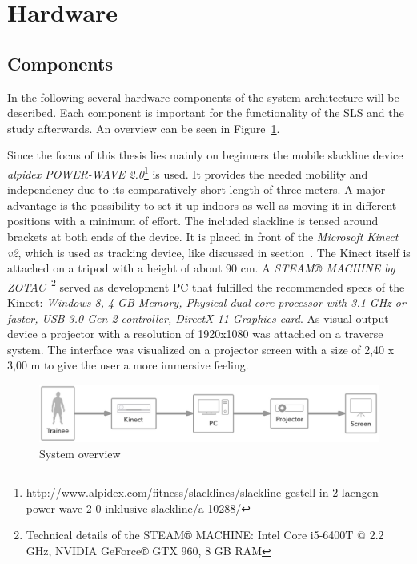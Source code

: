 \section{Hardware}\label{5_1_systemSetup}
\subsection{Components}\label{5_1_hardwareComponents}
In the following several hardware components of the system architecture will be described. Each component is important for the functionality of the SLS and the study afterwards. An overview can be seen in Figure~\ref{fig:5_3_systemArchitecture}.

Since the focus of this thesis lies mainly on beginners the mobile slackline device \textit{alpidex POWER-WAVE 2.0}\footnote{\url{http://www.alpidex.com/fitness/slacklines/slackline-gestell-in-2-laengen-power-wave-2-0-inklusive-slackline/a-10288/}} is used.
It provides the needed mobility and independency due to its comparatively short length of three meters.
A major advantage is the possibility to set it up indoors as well as moving it in different positions with a minimum of effort.
The included slackline is tensed around brackets at both ends of the device.
It is placed in front of the \textit{Microsoft Kinect v2}, which is used as tracking device, like discussed in section~\textit{}. The Kinect itself is attached on a tripod with a height of about 90 cm.
A \textit{STEAM® MACHINE by ZOTAC}~\footnote{Technical details of the STEAM® MACHINE: Intel Core i5-6400T @ 2.2 GHz, NVIDIA GeForce® GTX 960, 8 GB RAM} served as development PC that fulfilled the recommended specs of the Kinect: \textit{Windows 8, 4 GB Memory, Physical dual-core processor with 3.1 GHz or faster, USB 3.0 Gen-2 controller, DirectX 11 Graphics card}. As visual output device a projector with a resolution of 1920x1080 was attached on a traverse system.
The interface was visualized on a projector screen with a size of 2,40 x 3,00 m to give the user a more immersive feeling.

\begin{figure}[htb]
	\centering
	\begin{minipage}[t]{1\linewidth}
		\centering
		\includegraphics[width=1\linewidth]{Pictures/5_3_systemArchitecture}
		\caption{System overview}
		\label{fig:5_3_systemArchitecture}
	\end{minipage}
\end{figure}

